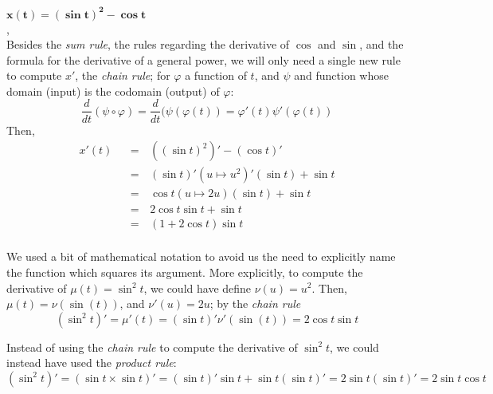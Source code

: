 \documentclass[solutions.tex]{subfiles}
\begin{document}
\hr
$\bm{x(t) = (\sin t)^2 - \cos t}$ \\, \\
Besides the \textit{sum rule}, the rules regarding the derivative
of $\cos$ and $\sin$, and the formula for the derivative of a general
power, we will only need a single new rule to compute $x'$, the \textit{chain rule};
for $\varphi$ a function of $t$, and $\psi$ and function whose domain (input)
is the codomain (output) of $\varphi$:
\[
	\frac{d}{dt}(\psi\circ\varphi) = \frac{d}{dt}(\psi(\varphi(t)) = \varphi'(t)\psi'(\varphi(t))
\]
Then,
\begin{equation*} \begin{aligned}
	x'(t) &&=\,& ((\sin t)^2)'-(\cos t)' \\
	~ &&=\,& (\sin t)'(u \mapsto u^2)'(\sin t) + \sin t \\
	~ &&=\,& \cos t (u \mapsto 2u)(\sin t) + \sin t \\
	~ &&=\,& 2\cos t\sin t + \sin t \\
	~ &&=\,& \boxed{(1+2\cos t)\sin t} \\
\end{aligned} \end{equation*}
\begin{remark} We used a bit of mathematical notation to avoid us the need
to explicitly name the function which squares its argument. More explicitly,
to compute the derivative of $\mu(t) = \sin^2t$, we could have define
$\nu(u) = u^2$. Then, $\mu(t) = \nu(\sin(t))$, and $\nu'(u) = 2u$;
by the \textit{chain rule}
\[
	(\sin^2 t)' = \mu'(t) = (\sin t)'\nu'(\sin(t)) = 2\cos t\sin t
\]
\end{remark}
\begin{remark} Instead of using the \textit{chain rule} to compute the
derivative of $\sin^2t$, we could instead have used the \textit{product rule}:
\[
	(\sin^2t)' = (\sin t \times \sin t)' = (\sin t)' \sin t + \sin t(\sin t)'
		= 2\sin t(\sin t)' = 2\sin t\cos t
\]
\end{remark}
\end{document}
